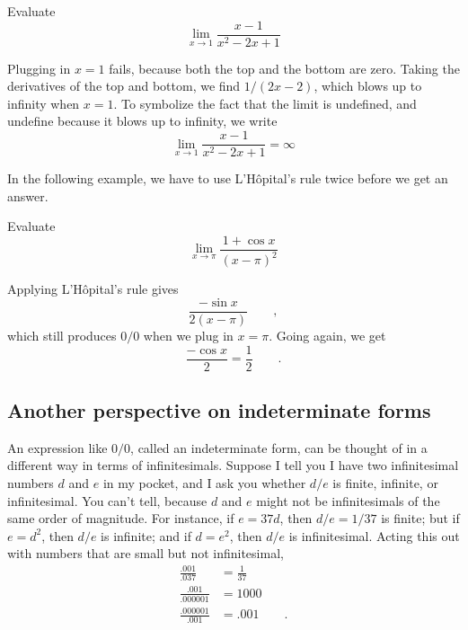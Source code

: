 \begin{eg}
\egquestion Evaluate
\begin{equation*}
  \lim_{x\rightarrow 1} \frac{x-1}{x^2-2x+1}
\end{equation*}

\eganswer Plugging in $x=1$ fails, because both the top and the bottom are zero.
Taking the derivatives of the top and bottom, we find $1/(2x-2)$, which blows up to
infinity when $x=1$. To symbolize the fact that
the limit is undefined, and undefine because it blows up to infinity, we write
\begin{equation*}
  \lim_{x\rightarrow 1} \frac{x-1}{x^2-2x+1} = \infty
\end{equation*}
\end{eg}

In the following example, we have to use L'H\^{o}pital's rule twice before we get an answer.

\begin{eg}
\egquestion Evaluate
\begin{equation*}
  \lim_{x\rightarrow \pi} \frac{1+\cos x}{(x-\pi)^2}
\end{equation*}

\eganswer Applying  L'H\^{o}pital's rule gives
\begin{equation*}
  \frac{-\sin x}{2(x-\pi)} \qquad ,
\end{equation*}
which still produces $0/0$ when we plug in $x=\pi$. Going again, we get
\begin{equation*}
  \frac{-\cos x}{2} = \frac{1}{2} \qquad .
\end{equation*}
\end{eg}

\subsection{Another perspective on indeterminate forms}

An expression like $0/0$, called an indeterminate form,
can be thought of in a different way in terms of
infinitesimals. Suppose I tell you I have two infinitesimal numbers $d$ and $e$ in my
pocket, and I ask you whether $d/e$ is finite, infinite, or infinitesimal.
You can't tell, because $d$ and $e$ might not be infinitesimals of the same order of
magnitude. For instance, if $e=37d$, then $d/e=1/37$ is finite; but if
$e=d^2$, then $d/e$ is infinite; and if $d=e^2$, then $d/e$ is infinitesimal.
Acting this out with numbers that are small but not infinitesimal,
\begin{align*}
  \frac{.001}{.037} &= \frac{1}{37} \\
  \frac{.001}{.000001} &= 1000 \\
  \frac{.000001}{.001} &= .001 \qquad.
\end{align*}

